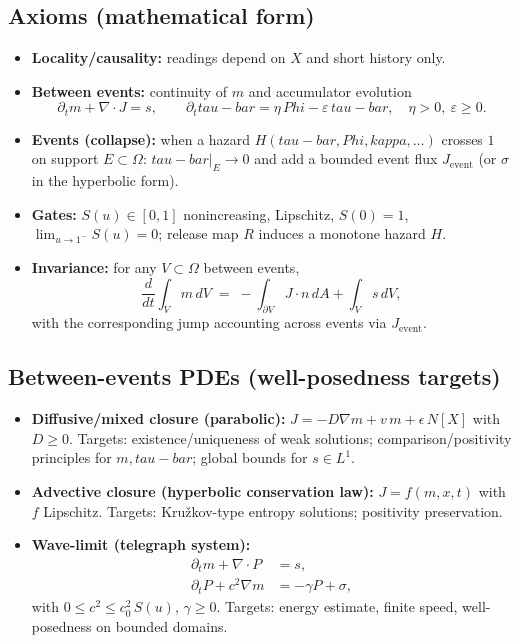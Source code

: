 \documentclass[12pt]{article}
\newcommand{\FoldDensity}{\Phi}
\newcommand{\FoldTime}{\bar{\tau}}
\newcommand{\Threshold}{\kappa}
\newcommand{\Survival}{S}
\newcommand{\Release}{R}
\def\FoldDensity{Phi}%
\def\FoldTime{tau-bar}%
\def\Threshold{kappa}%
\def\Survival{S}%
\def\Release{R}%
\def\bar#1{#1}%
\def\mathcal#1{#1}%
\begin{document}
\subsection{Axioms (mathematical form)}
\begin{itemize}
  \item \textbf{Locality/causality:} readings depend on $X$ and short history only.
  \item \textbf{Between events:} continuity of $m$ and accumulator evolution
  \[
  \partial_t m+\nabla\!\cdot J=s,\qquad
  \partial_t\FoldTime=\eta\,\FoldDensity-\varepsilon\,\FoldTime,\quad \eta>0,\ \varepsilon\ge 0.
  \]
  \item \textbf{Events (collapse):} when a hazard $H(\FoldTime,\FoldDensity,\Threshold,\ldots)$ crosses $1$ on support $E\subset\Omega$:
  $\FoldTime|_E\to 0$ and add a bounded event flux $J_{\text{event}}$ (or $\sigma$ in the hyperbolic form).
  \item \textbf{Gates:} $\Survival(u)\in[0,1]$ nonincreasing, Lipschitz, $\Survival(0)=1$, $\lim_{u\to 1^-}\Survival(u)=0$; release map $\Release$ induces a monotone hazard $H$.
  \item \textbf{Invariance:} for any $V\subset\Omega$ between events,
  \[
  \frac{d}{dt}\int_V m\,dV \;=\; -\int_{\partial V}J\cdot n\,dA + \int_V s\,dV,
  \]
  with the corresponding jump accounting across events via $J_{\text{event}}$.
\end{itemize}

\subsection{Between-events PDEs (well-posedness targets)}
\begin{itemize}
  \item \textbf{Diffusive/mixed closure (parabolic):} $J = -D\nabla m + v\,m + \epsilon\,\mathcal{N}[X]$ with $D\ge 0$. Targets: existence/uniqueness of weak solutions; comparison/positivity principles for $m,\FoldTime$; global bounds for $s\in L^1$.
  \item \textbf{Advective closure (hyperbolic conservation law):} $J=f(m,x,t)$ with $f$ Lipschitz. Targets: Kružkov-type entropy solutions; positivity preservation.
  \item \textbf{Wave-limit (telegraph system):}
  \begin{align*}
  \partial_t m+\nabla\!\cdot P &= s,\\
  \partial_t P + c^2\nabla m &= -\gamma P + \sigma,
  \end{align*}
  with $0\le c^2\le c_0^2\,\Survival(u)$, $\gamma\ge 0$. Targets: energy estimate, finite speed, well-posedness on bounded domains.
\end{itemize}
\end{document}
